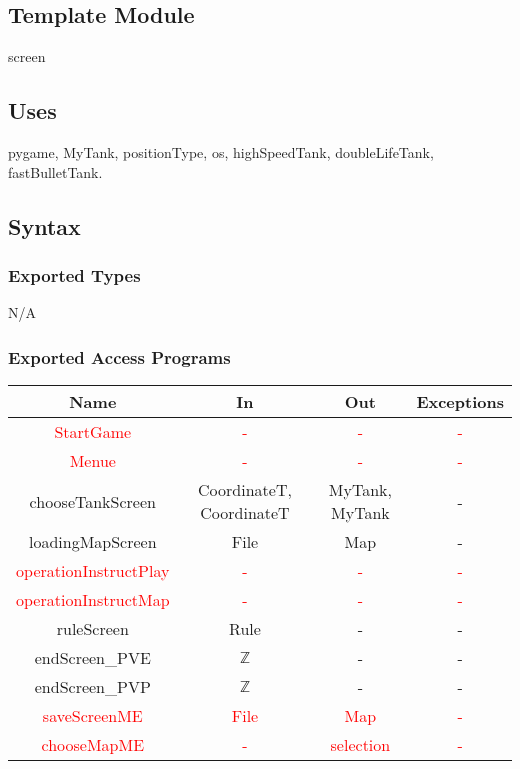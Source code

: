 \documentclass[12pt, titlepage]{article}
\begin{document}
        \subsection{Template Module}
        screen
        \subsection{Uses}
        pygame, MyTank, positionType, os, highSpeedTank, doubleLifeTank, fastBulletTank.
		\subsection{Syntax}
		\subsubsection{Exported Types}
		N/A
		\subsubsection{Exported Access Programs}
		\begin{tabular}[pos]{|c|c|c|c|}
			
			\hline
			\textbf{Name}& \textbf{In} & \textbf{Out} & \textbf{Exceptions} \\ \hline
			\textcolor{red}{StartGame} & \textcolor{red}{-} & \textcolor{red}{-} & \textcolor{red}{-}\\ \hline
			\textcolor{red}{Menue} & \textcolor{red}{-} & \textcolor{red}{-} & \textcolor{red}{-}\\ \hline
			chooseTankScreen & CoordinateT, CoordinateT & MyTank, MyTank & -\\ \hline
    		loadingMapScreen & File & Map & -\\ \hline
    		\textcolor{red}{operationInstructPlay} & \textcolor{red}{-} & \textcolor{red}{-} & \textcolor{red}{-}\\ \hline
    		\textcolor{red}{operationInstructMap} & \textcolor{red}{-} & \textcolor{red}{-} & \textcolor{red}{-}\\ \hline
    		ruleScreen & Rule & - & -\\ \hline
    		endScreen\_PVE & $\mathbb{Z}$ & - & -\\ \hline
    		endScreen\_PVP & $\mathbb{Z}$ & - & -\\ \hline
    		\textcolor{red}{saveScreenME} & \textcolor{red}{File} & \textcolor{red}{Map} & \textcolor{red}{-}\\ \hline
    		\textcolor{red}{chooseMapME} & \textcolor{red}{-} & \textcolor{red}{selection} & \textcolor{red}{-}\\ \hline
			
		\end{tabular}
\end{document}
